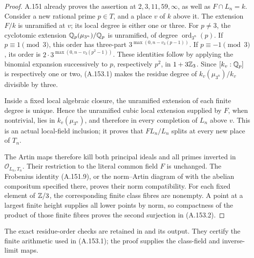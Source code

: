 \begin{proof}
A.151 already proves the assertion at \(2,3,11,59,\infty\),
as well as \(F\cap L_n=k\).
Consider a new rational prime \(p\in T\), and a place \(v\) of
\(k\) above it.  The extension \(F/k\) is unramified at \(v\);
its local degree is either one or three.
For \(p\ne3\), the cyclotomic extension
\(\mathbb Q_p(\mu_{3^n})/\mathbb Q_p\) is unramified, of degree
\(\operatorname{ord}_{3^n}(p)\).
If \(p\equiv1\pmod3\), this order has three-part
\(3^{\max(0,n-v_3(p-1))}\).
If \(p\equiv-1\pmod3\), its order is
\(2\cdot3^{\max(0,n-v_3(p^2-1))}\).
These identities follow by applying the binomial expansion successively
to \(p\), respectively \(p^2\), in \(1+3\mathbb Z_3\).
Since \([k_v:\mathbb Q_p]\) is respectively one or two, (A.153.1) makes
the residue degree of
\(k_v(\mu_{3^n})/k_v\) divisible by three.

Inside a fixed local algebraic closure, the unramified extension of
each finite degree is unique.  Hence the unramified cubic local
extension supplied by \(F\), when nontrivial, lies in
\(k_v(\mu_{3^n})\), and therefore in every completion of \(L_n\)
above \(v\).  This is an actual local-field inclusion; it proves that
\(FL_n/L_n\) splits at every new place of \(T_n\).

The Artin maps therefore kill both principal ideals and all primes
inverted in \(\mathcal O_{L_n,T_n}\).
Their restriction to the literal common field \(F\) is unchanged.
The Frobenius identity (A.151.9), or the norm--Artin diagram of
\cite[V, Proposition 3.3]{MilneCFT} with the abelian compositum
specified there, proves their norm compatibility.
For each fixed element of \(\mathbb Z/3\), the corresponding finite class
fibres are nonempty.  A point at a largest finite height supplies all
lower points by norm, so compactness of the product of those finite
fibres proves the second surjection in (A.153.2).
\end{proof}

The exact residue-order checks are retained in
and its output.  They certify the finite arithmetic used in
(A.153.1); the proof supplies the class-field and inverse-limit maps.
